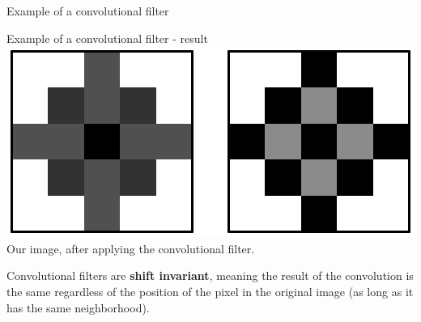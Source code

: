 \documentclass[9pt, aspectratio=169]{beamer}
\begin{document}
\begin{frame}
    {Example of a convolutional filter}
    \centering
\end{frame}

\begin{frame}
    {Example of a convolutional filter - result}
    \centering
    \includegraphics[width=.6\textwidth]{example_filter_before_after.png}\\

    Our image, after applying the convolutional filter.

    \pause
    \vspace{1em}
    Convolutional filters are \textbf{shift invariant}, meaning the result of the convolution is the same regardless of the position of the pixel in the original image (as long as it has the same neighborhood).

\end{frame}
\end{document}

